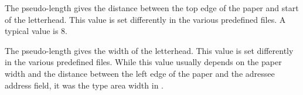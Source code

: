 \begin{Declaration}
\end{Declaration}
%
The pseudo-length  gives the distance between
the top edge of the paper and start of the letterhead. This value is
set differently in the various predefined  files. A typical
value is 8.
%

\begin{Declaration}
\end{Declaration}
%
The pseudo-length  gives the width of the
letterhead. This value is set differently in the various predefined
 files. While this value usually depends on the paper width
and the distance between the left edge of the paper and the adressee
address field, it was the type area width in .
%
%

